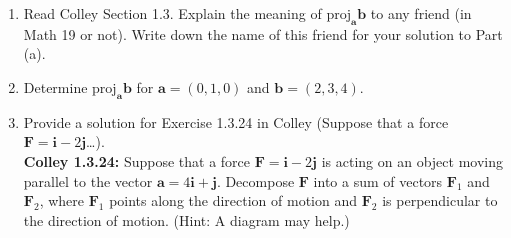 \documentclass[12pt,letterpaper]{hmcpset}
\begin{document}
\begin{problem}[4]
  \begin{enumerate}[label=(\alph*)]
  \item Read Colley Section 1.3. Explain the meaning of $\text{proj}_{\mathbf{a}} \mathbf{b}$
    to any friend (in Math 19 or not). Write down the name of this friend for your solution to Part (a).
  \item Determine $\text{proj}_{\mathbf{a}} \mathbf{b}$ for $\mathbf{a} = (0,1,0)$ and
    $\mathbf{b} = (2,3,4)$.
  \item Provide a solution for Exercise 1.3.24 in Colley (Suppose that a force $\mathbf{F} = \mathbf{i} - 2 \mathbf{j}$\dots). \\
    
    \textbf{Colley 1.3.24: } Suppose that a force $\mathbf{F} = \mathbf{i} - 2\mathbf{j}$ is acting on an object moving parallel to the vector $\mathbf{a} = 4\mathbf{i} + \mathbf{j}$. Decompose $\mathbf{F}$ into a sum of vectors $\mathbf{F}_1$ and $\mathbf{F}_2$, where $\mathbf{F}_1$ points along the direction of motion and $\mathbf{F}_2$ is perpendicular to the direction of motion. (Hint: A diagram may help.)
  \end{enumerate}
\end{problem}
\end{document}
